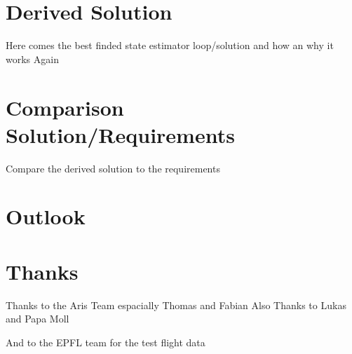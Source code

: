 \section{Derived Solution}
Here comes the best finded state estimator loop/solution and how an why it works
Again


\section{Comparison Solution/Requirements}
Compare the derived solution to the requirements

\section{Outlook}
\section{Thanks}
Thanks to the Aris Team espacially Thomas and Fabian
Also Thanks to Lukas and Papa Moll

And to the EPFL team for the test flight data


